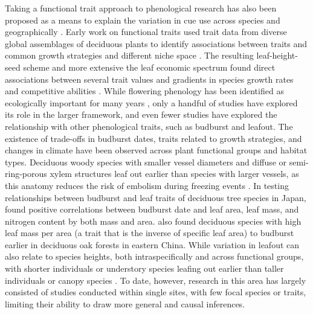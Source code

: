 \documentclass{article}\usepackage[]{graphicx}\usepackage[]{color}
\begin{document}
Taking a functional trait approach to phenological research has also been proposed as a means to explain the variation in cue use across species and geographically \citep{Flynn2018,Osada2017}. Early work on functional traits used trait data from diverse global assemblages of deciduous plants to identify associations between traits and common growth strategies and different niche space \citep{Westoby1998,Wright2004,Chave2009}. The resulting leaf-height-seed scheme and more extensive the leaf economic spectrum found direct associations between several trait values and gradients in species growth rates and competitive abilities \citep{Westoby1998,Wright2004,Diaz2016,Chave2009,Funk2016}. While flowering phenology has been identified as ecologically important for many years \citep{Weiher1999, Laughlin2014 %
}, only a handful of studies have explored its role in the larger framework, and even fewer studies have explored the relationship with other phenological traits, such as budburst and leafout. The existence of trade-offs in budburst dates, traits related to growth strategies, and changes in climate have been observed across plant functional groups and habitat types. Deciduous woody species with smaller vessel diameters and diffuse or semi-ring-porous xylem structures leaf out earlier than species with larger vessels, as this anatomy reduces the risk of embolism during freezing events  \citep{Panchen2014, Lechowicz1984}. In testing relationships between budburst and leaf traits of deciduous tree species in Japan, \citep{Osada2017} found positive correlations between budburst date and leaf area, leaf mass, and nitrogen content by both mass and area. \citep{Sun2006} also found deciduous species with high leaf mass per area (a trait that is the inverse of specific leaf area) to budburst earlier in deciduous oak forests in eastern China. %
While variation in leafout can also relate to species heights, both intraspecifically and across functional groups, with shorter individuals or understory species leafing out earlier than taller individuals or canopy species \citep{Seiwa1998, 1999b}. To date, however, research in this area has largely consisted of studies conducted within single sites, with few focal species or traits, limiting their ability to draw more general and causal inferences. 

\end{document}
